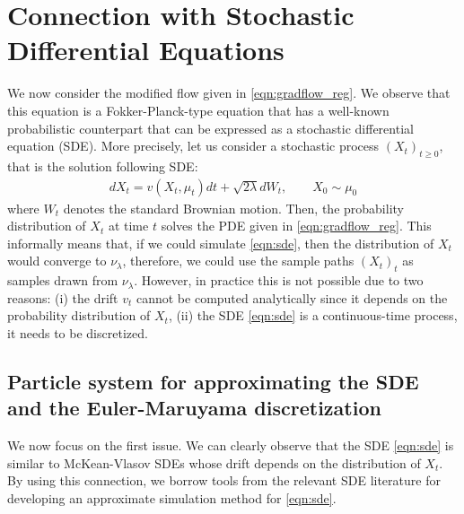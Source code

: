 


\section{Connection with Stochastic Differential Equations}

We now consider the modified flow given in \eqref{eqn:gradflow_reg}. We observe that this equation is a Fokker-Planck-type equation \cite{bogachev2015fokker} that has a well-known probabilistic counterpart that can be expressed as a stochastic differential equation (SDE). More precisely, let us consider a stochastic process $(X_t)_{t\geq0}$, that is the solution following SDE:
\begin{align}
d X_t = v(X_t,\mu_t) dt + \sqrt{2 \lambda } d W_t, \qquad X_0 \sim \mu_0 \label{eqn:sde}
\end{align}
where $W_t$ denotes the standard Brownian motion. Then, the probability distribution of $X_t$ at time $t$ solves the PDE given in \eqref{eqn:gradflow_reg}. This informally means that, if we could simulate \eqref{eqn:sde}, then the distribution of $X_t$ would converge to $\nu_\lambda$, therefore, we could use the sample paths $(X_t)_t$ as samples drawn from $\nu_\lambda$. However, in practice this is not possible due to two reasons: (i) the drift $v_t$ cannot be computed analytically since it depends on the probability distribution of $X_t$, (ii) the SDE \eqref{eqn:sde} is a continuous-time process, it needs to be discretized.  


\subsection{Particle system for approximating the SDE and the Euler-Maruyama discretization}





We now focus on the first issue. 
We can clearly observe that the SDE \eqref{eqn:sde} is similar to McKean-Vlasov SDEs \cite{veretennikov2006ergodic,mishura2016existence} whose drift depends on the distribution of $X_t$. By using this connection, we borrow tools from the relevant SDE literature \cite{malrieu03,cgm-08} for developing an approximate simulation method for \eqref{eqn:sde}. 

